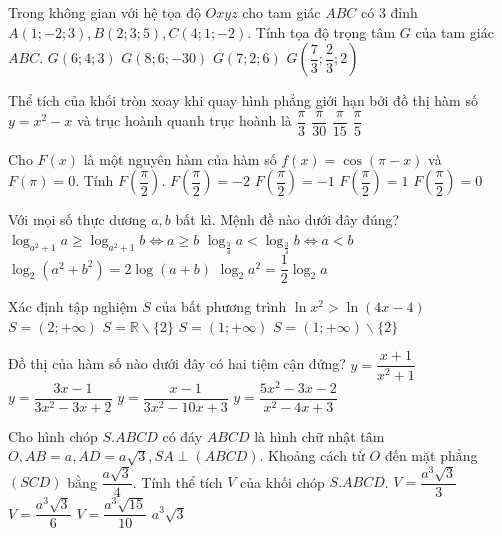 \begin{ex}%
Trong không gian với hệ tọa độ $O x y z$ cho tam giác $ABC$ có $3$ đỉnh $A(1;-2; 3), B(2; 3; 5), C(4; 1;-2)$. Tính tọa độ trọng tâm $G$ của tam giác $ABC$.
\choice
{$G(6; 4; 3)$}
{$G(8; 6;-30)$}
{$G(7; 2; 6)$}
{\True $G\left(\dfrac{7}{3}; \dfrac{2}{3}; 2\right)$}

\end{ex}
\begin{ex}%
Thể tích của khối tròn xoay khi quay hình phẳng giới hạn bởi đồ thị hàm số $y=x^2-x$ và trục hoành quanh trục hoành là
\choice
{$\dfrac{\pi}{3}$}
{\True $\dfrac{\pi}{30}$}
{$\dfrac{\pi}{15}$}
{$\dfrac{\pi}{5}$}

\end{ex}
\begin{ex}%
Cho $F(x)$ là một nguyên hàm của hàm số $f(x)=\cos (\pi-x)$ và $F(\pi)=0$. Tính $F\left(\dfrac{\pi}{2}\right)$.
\choice
{$F\left(\dfrac{\pi}{2}\right)=-2$}
{\True $F\left(\dfrac{\pi}{2}\right)=-1$}
{$F\left(\dfrac{\pi}{2}\right)=1$}
{$F\left(\dfrac{\pi}{2}\right)=0$}

\end{ex}
\begin{ex}%
Với mọi số thực dương $a, b$ bất kì. Mệnh đề nào dưới đây đúng?
\choice
{\True $\log_{a^2+1} a \geq \log_{a^2+1} b \Leftrightarrow a \geq b$}
{$\log_{\frac{3}{4}} a<\log_{\frac{3}{4}} b \Leftrightarrow a<b$}
{$\log_2\left(a^2+b^2\right)=2\log (a+b)$}
{$\log_2 a^2=\dfrac{1}{2} \log_2 a$}

\end{ex}
\begin{ex}%
Xác định tập nghiệm $S$ của bất phương trình $\ln x^2>\ln (4 x-4)$ 
\choice
{$S=(2;+\infty)$}
{$S=\mathbb{R} \backslash\{2\}$}
{$S=(1;+\infty)$}
{\True $S=(1;+\infty) \backslash\{2\}$}

\end{ex}
\begin{ex}%
Đồ thị của hàm số nào dưới đây có hai tiệm cận đứng?
\choice
{$y=\dfrac{x+1}{x^2+1}$}
{$y=\dfrac{3 x-1}{3 x^2-3 x+2}$}
{\True $y=\dfrac{x-1}{3 x^2-10 x+3}$}
{$y=\dfrac{5 x^2-3 x-2}{x^2-4 x+3}$}

\end{ex}
\begin{ex}%
Cho hình chóp $S.ABCD$ có đáy $ABCD$ là hình chữ nhật tâm $O, AB=a, AD=a \sqrt{3}, SA \perp(ABCD)$. Khoảng cách từ $O$ đến mặt phẳng $(SCD)$ bằng $\dfrac{a \sqrt{3}}{4}$. Tính thể tích $V$ của khối chóp $S.ABCD$.
\choice
{\True $V=\dfrac{a^3 \sqrt{3}}{3}$}
{$V=\dfrac{a^3 \sqrt{3}}{6}$}
{$V=\dfrac{a^3 \sqrt{15}}{10}$}
{$a^3\sqrt{3}$}

\end{ex}
